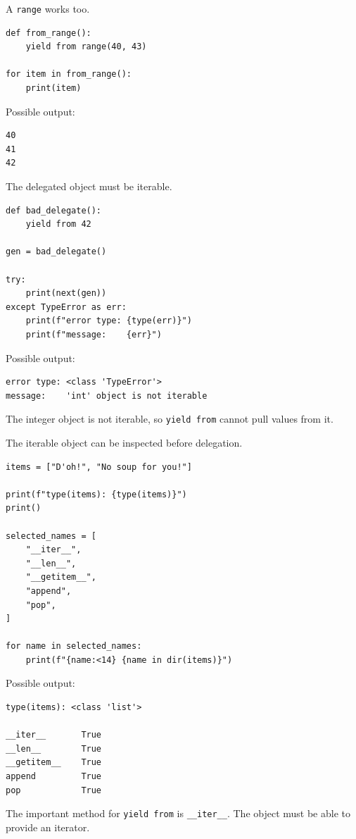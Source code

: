 A \texttt{range} works too.

\begin{verbatim}
def from_range():
    yield from range(40, 43)

for item in from_range():
    print(item)
\end{verbatim}

Possible output:

\begin{verbatim}
40
41
42
\end{verbatim}

The delegated object must be iterable.

\begin{verbatim}
def bad_delegate():
    yield from 42

gen = bad_delegate()

try:
    print(next(gen))
except TypeError as err:
    print(f"error type: {type(err)}")
    print(f"message:    {err}")
\end{verbatim}

Possible output:

\begin{verbatim}
error type: <class 'TypeError'>
message:    'int' object is not iterable
\end{verbatim}

The integer object is not iterable, so \texttt{yield from} cannot pull values from it.

The iterable object can be inspected before delegation.

\begin{verbatim}
items = ["D'oh!", "No soup for you!"]

print(f"type(items): {type(items)}")
print()

selected_names = [
    "__iter__",
    "__len__",
    "__getitem__",
    "append",
    "pop",
]

for name in selected_names:
    print(f"{name:<14} {name in dir(items)}")
\end{verbatim}

Possible output:

\begin{verbatim}
type(items): <class 'list'>

__iter__       True
__len__        True
__getitem__    True
append         True
pop            True
\end{verbatim}

The important method for \texttt{yield from} is \texttt{\_\_iter\_\_}. The object must be able to provide an iterator.

